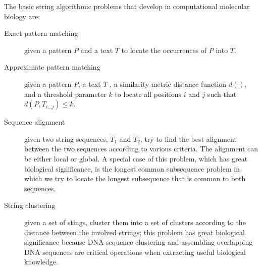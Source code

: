 \noindent
The basic string algorithmic problems that develop in computational molecular
biology are:
\begin{description}
    \item [Exact pattern matching] given a pattern $P$ and a text $T$ to locate the occurrences of $P$ into $T$.
    \item [Approximate pattern matching] given a pattern $P$, a text $T$ , a similarity metric distance function $d()$, and a threshold parameter $k$ to locate all positions $i$ and $j$ such that $d(P, T_{i \ldots j}) \leq k$.
    \item [Sequence alignment] given two string sequences, $T_1$ and $T_2$, try to find the best alignment between the two sequences according to various criteria. The alignment can be either local or global. A special case of this problem, which has great biological significance, is the longest common subsequence problem in which we try to locate the longest subsequence that is common to both sequences.
    \item [String clustering] given a set of stings, cluster them into a set of clusters according to the distance between the involved strings; this problem has great biological significance because DNA sequence clustering and assembling overlapping DNA sequences are critical operations when extracting useful biological knowledge.
\end{description}